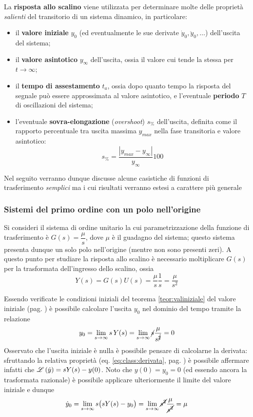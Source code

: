 		\begin{concetto}
			La \textbf{risposta allo scalino} viene utilizzata per determinare molte delle proprietà \textit{salienti} del transitorio di un sistema dinamico, in particolare:
			\begin{itemize}
				\item il \textbf{valore iniziale} $y_0$ (ed eventualmente le sue derivate $\dot y_0,\ddot y_0,\dots$) dell'uscita del sistema;
				\item il \textbf{valore asintotico} $y_\infty$ dell'uscita, ossia il valore cui tende la stessa per $t\rightarrow \infty$;
				\item il \textbf{tempo di assestamento} $t_a$, ossia dopo quanto tempo la risposta del segnale può essere approssimata al valore asintotico, e l'eventuale \textbf{periodo} $T$ di oscillazioni del sistema;
				\item l'eventuale \textbf{sovra-elongazione} (\textit{overshoot}) $s_\%$ dell'uscita, definita come il rapporto percentuale tra uscita massima $y_{max}$ nella fase transitoria e valore asintotico:
				\[ s_\% = \frac{|y_{max} - y_\infty|}{y_\infty} 100 \]
			\end{itemize}
		\end{concetto}
		Nel seguito verranno dunque discusse alcune casistiche di funzioni di trasferimento \textit{semplici} ma i cui risultati verranno estesi a carattere più generale
		
		\subsubsection{Sistemi del primo ordine con un polo nell'origine}
			Si consideri il sistema di ordine unitario la cui parametrizzazione della funzione di trasferimento è $G(s) = \dfrac \mu s$, dove $\mu$ è il guadagno del sistema; questo sistema presenta dunque un solo polo nell'origine (mentre non sono presenti zeri). A questo punto per studiare la risposta allo scalino è necessario moltiplicare $G(s)$ per la trasformata dell'ingresso dello scalino, ossia
			\[ Y(s) = G(s) U(s) = \frac \mu s \frac 1 s = \frac{\mu}{s^2} \]
			
			Essendo verificate le condizioni iniziali del teorema \ref{teor:valiniziale} del valore iniziale (pag. \pageref{teor:valiniziale}) è possibile calcolare l'uscita $y_0$ nel dominio del tempo tramite la relazione
			\[ y_0 = \lim_{s\rightarrow\infty}s \, Y(s) = \lim_{s\rightarrow\infty}\cancel{s}  \frac{\mu}{s^{\cancel{2}}} = 0 \]
			Osservato che l'uscita iniziale è nulla è possibile pensare di calcolarne la derivata: sfruttando la relativa proprietà (eq. \ref{eq:class:derivata}, pag. \pageref{eq:class:derivata}) è possibile affermare infatti che $\mathscr L \left( \dot y \right) = s Y(s) - y(0)$. Noto che $y(0)=y_0=0$ (ed essendo ancora la trasformata razionale) è possibile applicare ulteriormente il limite del valore iniziale e dunque
			\[ \dot y_0 = \lim_{s\rightarrow \infty} s \big(sY(s) - y_0\big) = \lim_{s\rightarrow\infty} \cancel{s^2} \frac{\mu}{\cancel{s^2}} = \mu \]
	
